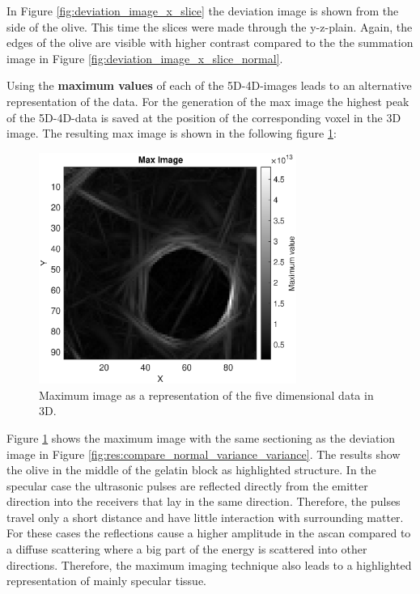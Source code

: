 In Figure \ref{fig:deviation_image_x_slice} the deviation image is shown from the side of the olive. This time the slices were made through the y-z-plain. Again, the edges of the olive are visible with higher contrast compared to the the summation image in Figure \ref{fig:deviation_image_x_slice_normal}. 


\bigskip
\bigskip



Using the \textbf{maximum values} of each of the 5D-4D-images leads to an alternative representation of the data. For the generation of the max image the highest peak of the 5D-4D-data is saved at the position of the corresponding voxel in the 3D image. The resulting max image is shown in the following figure \ref{fig:max_image}:


\begin{figure}[H]
    \centering
    \includegraphics[width=0.75\textwidth]{Graphics/Results/Variance_Image/Max_Ortho_slice_87.eps}
    \caption{Maximum image as a representation of the five dimensional data in 3D.}
    \label{fig:max_image}
\end{figure}




Figure \ref{fig:max_image} shows the maximum image with the same sectioning as the deviation image in Figure \ref{fig:res:compare_normal_variance_variance}. The results show the olive in the middle of the gelatin block as highlighted structure. In the specular case the ultrasonic pulses are reflected directly from the emitter direction into the receivers that lay in the same direction. Therefore, the pulses travel only a short distance and have little interaction with surrounding matter. For these cases the reflections cause a higher amplitude in the \ac{ascan} compared to a diffuse scattering where a big part of the energy is scattered into other directions. Therefore, the maximum imaging technique also leads to a highlighted representation of mainly specular tissue. 




